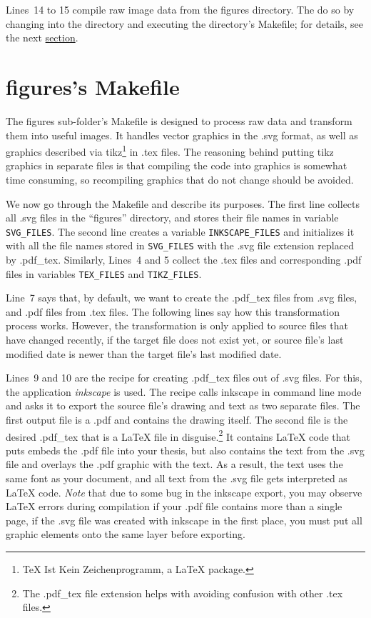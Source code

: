 Lines~14 to 15 compile raw image data from the figures directory.
The do so by changing into the directory and executing the directory's
Makefile; for details, see the next \hyperref[sec:makefiles:figures]{section}.



\section{figures's Makefile}
\label{sec:makefiles:figures}
The figures sub-folder's Makefile is designed to process raw data and transform
them into useful images.
It handles vector graphics in the \mbox{.svg} format, as well as graphics
described via tikz\footnote{\TeX{} Ist Kein Zeichenprogramm, a \LaTeX{}
package.} in \mbox{.tex} files.
The reasoning behind putting tikz graphics in separate files is that compiling 
the code into graphics is somewhat time consuming, so recompiling graphics that
do not change should be avoided.

We now go through the Makefile and describe its purposes.
The first line collects all \mbox{.svg} files in the ``figures'' directory, and
stores their file names in variable \texttt{SVG\_FILES}.
The second line creates a variable \texttt{INKSCAPE\_FILES} and initializes it
with all the file names stored in \texttt{SVG\_FILES} with the \mbox{.svg} file
extension replaced by \mbox{.pdf\_tex}.
Similarly, Lines~4 and 5 collect the \mbox{.tex} files and corresponding
\mbox{.pdf} files in variables \texttt{TEX\_FILES} and \texttt{TIKZ\_FILES}.

Line~7 says that, by default, we want to create the \mbox{.pdf\_tex} files from
\mbox{.svg} files, and \mbox{.pdf} files from \mbox{.tex} files.
The following lines say how this transformation process works.
However, the transformation is only applied to source files that have changed
recently, \ie{} if the target file does not exist yet, or source file's last
modified date is newer than the target file's last modified date.

Lines~9 and 10 are the recipe for creating \mbox{.pdf\_tex} files out of
\mbox{.svg} files.
For this, the application \emph{inkscape} is used.
The recipe calls inkscape in command line mode and asks it to export the source
file's drawing and text as two separate files.
The first output file is a \mbox{.pdf} and contains the drawing itself.
The second file is the desired \mbox{.pdf\_tex} that is a \LaTeX{} file in
disguise.\footnote{The \mbox{.pdf\_tex} file extension helps with avoiding
confusion with other \mbox{.tex} files.}
It contains \LaTeX{} code that puts embeds the \mbox{.pdf} file into your
thesis, but also contains the text from the \mbox{.svg} file and overlays the
\mbox{.pdf} graphic with the text.
As a result, the text uses the same font as your document, and all text from
the \mbox{.svg} file gets interpreted as \LaTeX{} code.
\emph{Note} that due to some bug in the inkscape export, you may observe
\LaTeX{} errors during compilation if your \mbox{.pdf} file contains more than
a single page, \ie{} if the \mbox{.svg} file was created with inkscape in the
first place, you must put all graphic elements onto the same layer before
exporting.

